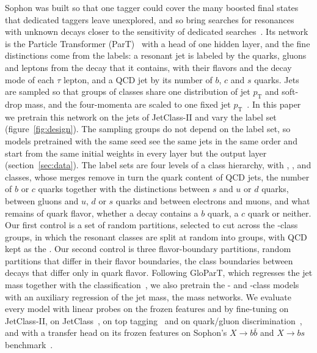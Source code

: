 Sophon was built so that one tagger could cover the many boosted final states that dedicated taggers leave
unexplored, and so bring searches for resonances with unknown decays closer to the sensitivity of dedicated
searches~\cite[Sec.~I]{sophon}. Its network is the Particle Transformer (ParT)~\cite{part} with a head of one
hidden layer, and the fine distinctions come from the labels: a resonant jet is labeled by the quarks, gluons
and leptons from the decay that it contains, with their flavors and the decay mode of each $\tau$ lepton, and a
QCD jet by its number of $b$, $c$ and $s$ quarks. Jets are sampled so that groups of classes share one
distribution of jet $p_{\mathrm T}$ and soft-drop mass, and the four-momenta are scaled to one fixed jet
$p_{\mathrm T}$~\cite[Sec.~II and App.~B]{sophon}.
In this paper we pretrain this network on the jets of JetClass-II and vary the label set
(figure~\ref{fig:design}). The sampling
groups do not depend on the label set, so models pretrained with the same seed see the same jets in the same
order and start from the same initial weights in every layer but the output layer (section~\ref{sec:data}). The
label sets are four levels of a class hierarchy, with \Kfull, \Kres, \Kmid{} and \Kcoarse{} classes, whose
merges remove in turn the quark content of QCD jets, the number of $b$ or $c$ quarks together with the
distinctions between $s$ and $u$ or $d$ quarks, between gluons and $u$, $d$ or $s$ quarks and between electrons and muons, and
what remains of quark flavor, whether a decay contains a $b$ quark, a $c$ quark or neither. Our first
control is a set of random partitions, selected to cut across the \Kcoarse-class groups, in which the
\LitJetClassTwoNResonantClasses{} resonant classes are split at random into \RandVtwoNResGroups{} groups, with QCD
kept as the \RandVtwoQcdGroupOrd. Our second control is three flavor-boundary partitions, random partitions that differ
in their flavor boundaries, the class boundaries between decays that differ only in quark flavor. Following
GloParT, which regresses the jet mass together with the classification~\cite{glopart,glopartdp}, we also
pretrain the \Kres- and \Kcoarse-class models with an auxiliary regression of the jet mass, the mass networks. We evaluate every model with linear
probes on the frozen features and by fine-tuning on JetClass-II, on JetClass~\cite{part}, on top
tagging~\cite{toptag} and on quark/gluon discrimination~\cite{efn,qgpythia,qgherwig}, and with a transfer head
on its frozen features on Sophon's $X\to b\bar b$ and $X\to bs$ benchmark~\cite{sophon}. %


